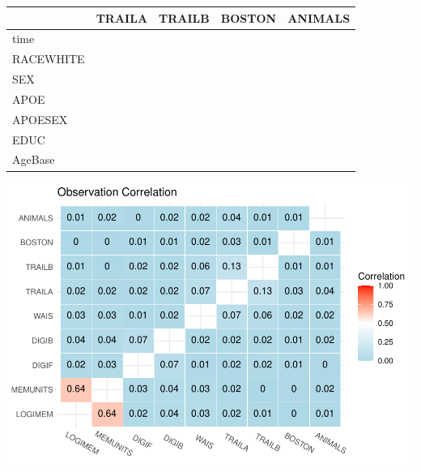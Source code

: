 \documentclass[
]{article}
\begin{document}
\begin{longtable}[t]{l|l|l|l|l}
\hline
  & TRAILA & TRAILB & BOSTON & ANIMALS\\
\hline
time & \cellcolor{red}{-0.06 (-0.10, -0.01)} & \cellcolor{red}{-0.14 (-0.18, -0.09)} & \cellcolor{white}{-0.00 (-0.04, 0.03)} & \cellcolor{red}{-0.08 (-0.13, -0.04)}\\
\hline
RACEWHITE & \cellcolor{green}{0.01 (-0.02, 0.05)} & \cellcolor{white}{0.08 (0.04, 0.12)} & \cellcolor{green}{0.06 (0.03, 0.09)} & \cellcolor{white}{0.04 (-0.00, 0.08)}\\
\hline
SEX & \cellcolor{white}{0.01 (-0.02, 0.05)} & \cellcolor{white}{-0.03 (-0.06, 0.00)} & \cellcolor{white}{0.01 (-0.02, 0.04)} & \cellcolor{white}{0.01 (-0.03, 0.04)}\\
\hline
APOE & \cellcolor{white}{-0.00 (-0.06, 0.06)} & \cellcolor{white}{-0.01 (-0.06, 0.04)} & \cellcolor{white}{-0.02 (-0.07, 0.02)} & \cellcolor{white}{-0.00 (-0.06, 0.05)}\\
\hline
APOESEX & \cellcolor{white}{-0.00 (-0.07, 0.07)} & \cellcolor{white}{0.01 (-0.05, 0.08)} & \cellcolor{white}{0.01 (-0.05, 0.06)} & \cellcolor{white}{-0.05 (-0.12, 0.02)}\\
\hline
EDUC & \cellcolor{green}{0.00 (-0.00, 0.00)} & \cellcolor{green}{0.00 (0.00, 0.01)} & \cellcolor{white}{0.00 (-0.00, 0.00)} & \cellcolor{white}{0.00 (-0.00, 0.00)}\\
\hline
AgeBase & \cellcolor{red}{-0.02 (-0.02, -0.01)} & \cellcolor{red}{-0.01 (-0.02, -0.01)} & \cellcolor{red}{-0.01 (-0.01, -0.01)} & \cellcolor{red}{-0.01 (-0.01, -0.01)}\\
\hline
\end{longtable}
\endgroup{}

\includegraphics{DataAnalysis_files/figure-latex/unnamed-chunk-6-1.pdf}
\end{document}

